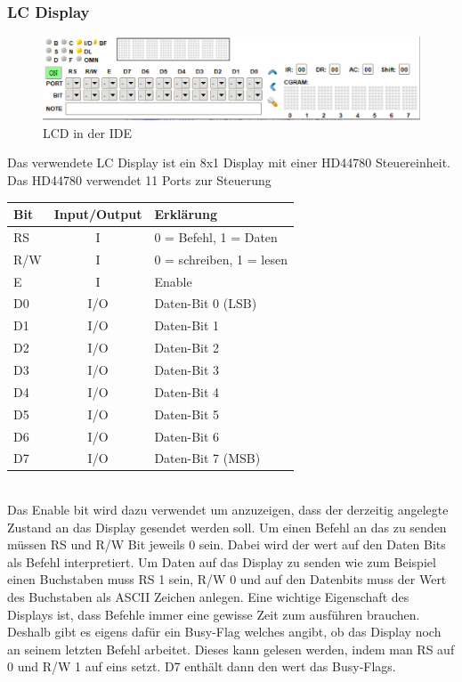 \documentclass[a4paper,12pt]{article}
\begin{document}
	\subsubsection{LC Display}
	\begin{figure}[bt]
		\centering
		\includegraphics[width=0.7\linewidth]{Bilder/lcd}
		\caption[IDE Screenshot]{LCD in der IDE}
		\label{fig:ide8051lcd}
	\end{figure}
	Das verwendete LC Display ist ein 8x1 Display mit einer HD44780 Steuereinheit. Das HD44780 verwendet 11 Ports zur Steuerung
	
	\begin{tabular}{l|c|l}
		Bit & Input/Output & Erklärung \\ \hline
		RS & I & 0 = Befehl, 1 = Daten \\
		R/W & I & 0 = schreiben, 1 = lesen \\
		E & I & Enable \\
		D0 & I/O & Daten-Bit 0 (LSB) \\
		D1 & I/O & Daten-Bit 1 \\
		D2 & I/O & Daten-Bit 2 \\
		D3 & I/O & Daten-Bit 3 \\
		D4 & I/O & Daten-Bit 4 \\
		D5 & I/O & Daten-Bit 5 \\
		D6 & I/O & Daten-Bit 6 \\
		D7 & I/O & Daten-Bit 7 (MSB)
	\end{tabular}\\
	
	Das Enable bit wird dazu verwendet um anzuzeigen, dass der derzeitig angelegte Zustand an das Display gesendet werden soll. Um einen Befehl an das zu senden müssen RS und R/W Bit jeweils 0 sein. Dabei wird der wert auf den Daten Bits als Befehl interpretiert. Um Daten auf das Display zu senden wie zum Beispiel einen Buchstaben muss RS 1 sein, R/W 0 und auf den Datenbits muss der Wert des Buchstaben als ASCII Zeichen anlegen. Eine wichtige Eigenschaft des Displays ist, dass Befehle immer eine gewisse Zeit zum ausführen brauchen. Deshalb gibt es eigens dafür ein Busy-Flag welches angibt, ob das Display noch an seinem letzten Befehl arbeitet. Dieses kann gelesen werden, indem man RS auf 0 und R/W 1 auf eins setzt. D7 enthält dann den wert das Busy-Flags.
\end{document}
